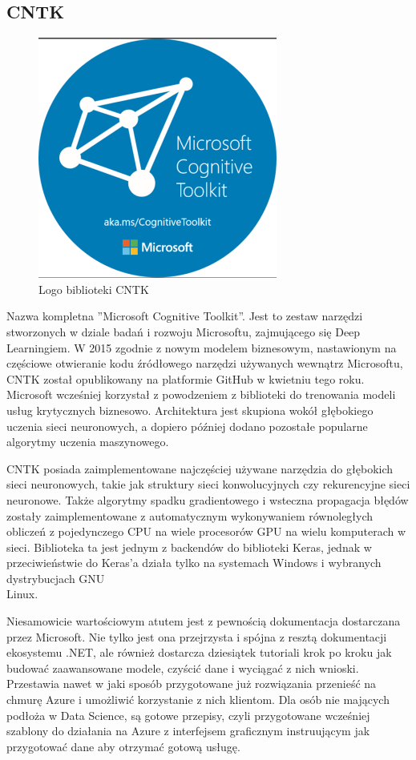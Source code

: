 \documentclass[12pt,a4paper,twoside,titlepage,openright]{book}
\begin{document}
\subsection{CNTK}
\begin{figure}[h]
	\centering
			\includegraphics[resolution=120]{CNTK.png}
		\caption{Logo biblioteki CNTK}
\end{figure}
Nazwa kompletna ''Microsoft Cognitive Toolkit''. Jest to zestaw narzędzi stworzonych w dziale badań i rozwoju Microsoftu, zajmującego się Deep Learningiem. W 2015 zgodnie z nowym modelem biznesowym, nastawionym na częściowe otwieranie kodu źródłowego narzędzi używanych wewnątrz Microsoftu, CNTK został opublikowany na platformie GitHub w kwietniu tego roku. Microsoft wcześniej korzystał z powodzeniem z biblioteki do trenowania modeli usług krytycznych biznesowo. Architektura jest skupiona wokół głębokiego uczenia sieci neuronowych, a dopiero później dodano pozostałe popularne algorytmy uczenia maszynowego.

CNTK posiada zaimplementowane najczęściej używane narzędzia do głębokich sieci neuronowych, takie jak struktury sieci konwolucyjnych czy rekurencyjne sieci neuronowe. Także algorytmy spadku gradientowego i wsteczna propagacja błędów zostały zaimplementowane z automatycznym wykonywaniem równoległych obliczeń z pojedynczego CPU na wiele procesorów GPU na wielu komputerach w sieci. Biblioteka ta jest jednym z backendów do biblioteki Keras, jednak w przeciwieństwie do Keras'a działa tylko na systemach Windows i wybranych dystrybucjach GNU\\Linux.

Niesamowicie wartościowym atutem jest z pewnością dokumentacja dostarczana przez Microsoft. Nie tylko jest ona przejrzysta i spójna z resztą dokumentacji ekosystemu .NET, ale również dostarcza dziesiątek tutoriali krok po kroku jak budować zaawansowane modele, czyścić dane i wyciągać z nich wnioski. Przestawia nawet w jaki sposób przygotowane już rozwiązania przenieść na chmurę Azure i umożliwić korzystanie z nich klientom. Dla osób nie mających podłoża w Data Science, są gotowe przepisy, czyli przygotowane wcześniej szablony do działania na Azure z interfejsem graficznym instruującym jak przygotować dane aby otrzymać gotową usługę.\cite{book:2187021}
\end{document}
